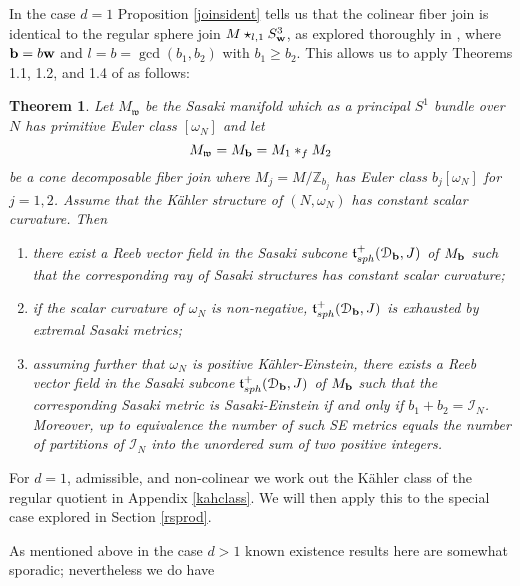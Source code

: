 \documentclass[12pt]{amsart}
\newtheorem{theorem}{Theorem}[section]
\def\bbz{{\mathbb Z}}
\def\gro{\omega}
\def\bfb{{\bf b}}
\def\bfw{{\bf w}}
\def\cald{{\mathcal D}}
\def\cali{{\mathcal I}}
\def\gt{{\mathfrak t}}
\def\gw{{\mathfrak w}}
\begin{document}
In the case $d=1$ Proposition \ref{joinsident} tells us that the colinear fiber join is identical to the regular sphere join $M\star_{l,1}S^{3}_{\bfw}$, as explored thoroughly in \cite{BoTo14a}, where $\bfb=b\bfw$ and $l=b=\gcd(b_1,b_{2})$ with $b_1\geq b_2$. This allows us to apply Theorems 1.1, 1.2, and 1.4 of \cite{BoTo14a} as follows:
\begin{theorem}\label{JGAthm}
Let $M_\gw$ be the Sasaki manifold which as a principal $S^1$ bundle over $N$ has primitive Euler class $[\gro_N]$ and let 
$$M_\gw=M_{\bfb}=M_{1}*_fM_{2}$$ 
be a cone decomposable fiber join where $M_{j}=M/\bbz_{b_j}$ has Euler class $b_j[\gro_N]$ for $j=1,2$.  Assume that the K\"ahler structure of $(N,\omega_N)$ has constant scalar curvature. Then
\begin{enumerate}
\item there exist a Reeb vector field in the Sasaki subcone $\gt^+_{sph}(\cald_\bfb,J)$ of $M_{\bfb}$ such that the corresponding ray of Sasaki structures has constant scalar curvature;
\item if the scalar curvature of $\omega_N$ is non-negative, $\gt^+_{sph}(\cald_\bfb,J)$  is exhausted by extremal Sasaki metrics;
\item assuming further that $\gro_N$ is positive K\"ahler-Einstein, there exists a Reeb vector field in the Sasaki subcone $\gt^+_{sph}(\cald_\bfb,J)$ of $M_\bfb$ such that the corresponding Sasaki metric is Sasaki-Einstein if and only if $b_1+b_2=\cali_N$. Moreover, up to equivalence the number of such SE metrics equals the number of partitions of $\cali_N$ into the unordered sum of two positive integers.
\end{enumerate}
\end{theorem}

For $d=1$, admissible, and non-colinear we work out the K\"ahler class of the regular quotient in Appendix \ref{kahclass}. We will then apply this to the special case explored in Section \ref{rsprod}.

As mentioned above in the case $d>1$ known existence results here are somewhat sporadic; nevertheless we do have
\end{document}
